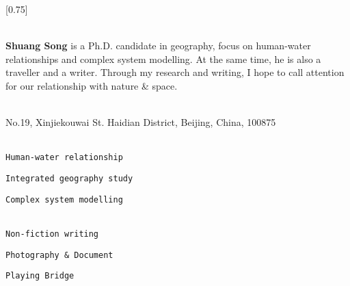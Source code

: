 \documentclass[lighthipster]{simplehipstercv}
\begin{document}
\setlength{\columnsep}{1.5cm}
[0.75]
\begin{paracol}{2}

\paracolbackgroundoptions



\footnotesize
{\setasidefontcolour
\flushright
\begin{center}
\end{center}

\\[0.5em]

\textbf{Shuang Song} is a Ph.D. candidate in geography, focus on human-water relationships and complex system modelling. At the same time, he is also a traveller and a writer. Through my research and writing, I hope to call attention for our relationship with nature \& space. 
\bigskip

 \\[0.5em]
No.19, Xinjiekouwai St. Haidian District, Beijing, China, 100875

\bigskip







\\[0.5em]

\texttt{Human-water relationship}

\texttt{Integrated geography study}

\texttt{Complex system modelling}

\bigskip
{}\\[0.5em]

\texttt{Non-fiction writing}

\texttt{Photography \& Document}

\texttt{Playing Bridge} 

\bigskip
\begin{minipage}[t]{0.2\textwidth}

\end{minipage}}
\end{paracol}
\end{document}
